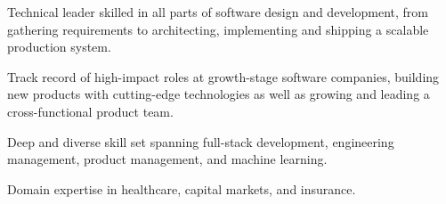 

\begin{cvparagraph}

Technical leader skilled in all parts of software design and development, from gathering requirements to
architecting, implementing and shipping a scalable production system.

Track record of high-impact roles at growth-stage software companies, building new products
with cutting-edge technologies as well as growing and leading a cross-functional product team.

Deep and diverse skill set spanning full-stack development, engineering management, product management,
and machine learning.

Domain expertise in healthcare, capital markets, and insurance.
\end{cvparagraph}
